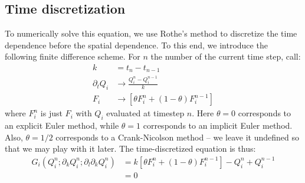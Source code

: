 \documentclass[reqno]{article}
\begin{document}
	\subsection{Time discretization}
	To numerically solve this equation, we use Rothe's method to discretize the time dependence before the spatial dependence.
	To this end, we introduce the following finite difference scheme.
	For $n$ the number of the current time step, call:
	\begin{align}
		k &= t_n - t_{n - 1} \\
		\partial_t Q_i &\to \frac{Q^n_i - Q^{n - 1}_i}{k} \\
		F_i &\to \left[ \theta F_i^n + (1 - \theta) F_i^{n - 1} \right]
	\end{align}
	where $F^n_i$ is just $F_i$ with $Q_i$ evaluated at timestep $n$.
	Here $\theta = 0$ corresponds to an explicit Euler method, while $\theta = 1$ corresponds to an implicit Euler method.
	Also, $\theta = 1/2$ corresponds to a Crank-Nicolson method -- we leave it undefined so that we may play with it later.
	The time-discretized equation is thus:
	\begin{equation}
	\begin{split}
		G_i \left(Q^n_i ; \partial_k Q^n_i ; \partial_l \partial_k Q^n_i\right)
		&= k \left[ \theta F^n_i + (1 - \theta) F^{n - 1}_i \right]
		- Q^n_i + Q^{n - 1}_i \\
		&= 0
	\end{split}
	\end{equation}
	
\end{document}
